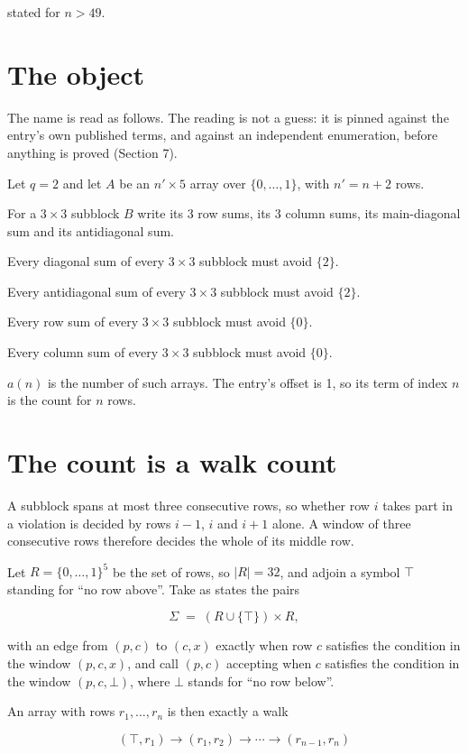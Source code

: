 \documentclass[11pt]{article}
\theoremstyle{definition}
\begin{document}
stated for $n > 49$.

\section{The object}

The name is read as follows. The reading is not a guess: it is pinned against the entry's own published terms, and against an independent enumeration, before anything is proved (Section 7).

Let $q = 2$ and let $A$ be an $n' \times 5$ array over $\{0,\dots,1\}$, with $n' = n + 2$ rows.

For a $3\times3$ subblock $B$ write its 3 row sums, its 3 column sums, its main-diagonal sum and its antidiagonal sum.

Every diagonal sum of every $3\times3$ subblock must avoid $\{2\}$.

Every antidiagonal sum of every $3\times3$ subblock must avoid $\{2\}$.

Every row sum of every $3\times3$ subblock must avoid $\{0\}$.

Every column sum of every $3\times3$ subblock must avoid $\{0\}$.

$a(n)$ is the number of such arrays. The entry's offset is 1, so its term of index $n$ is the count for $n$ rows.

\section{The count is a walk count}

A subblock spans at most three consecutive rows, so whether row $i$ takes part in a violation is decided by rows $i-1$, $i$ and $i+1$ alone. A window of three consecutive rows therefore decides the whole of its middle row.

Let $R = \{0,\dots,1\}^{5}$ be the set of rows, so $|R| = 32$, and adjoin a symbol $\top$ standing for ``no row above''. Take as states the pairs

\[\Sigma \;=\; (R \cup \{\top\}) \times R,\]

with an edge from $(p,c)$ to $(c,x)$ exactly when row $c$ satisfies the condition in the window $(p,c,x)$, and call $(p,c)$ accepting when $c$ satisfies the condition in the window $(p,c,\bot)$, where $\bot$ stands for ``no row below''.

An array with rows $r_1,\dots,r_n$ is then exactly a walk

\[(\top,r_1) \to (r_1,r_2) \to \cdots \to (r_{n-1},r_n)\]
\end{document}
